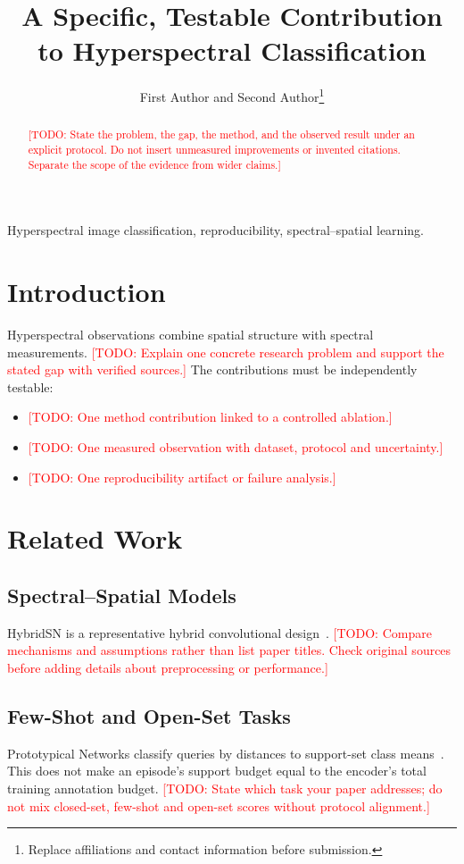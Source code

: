 \documentclass[journal]{IEEEtran}
\newcommand{\placeholder}[1]{\textcolor{red}{[TODO: #1]}}
\begin{document}
\title{A Specific, Testable Contribution to Hyperspectral Classification}
\author{First Author and Second Author\thanks{Replace affiliations and contact information before submission.}}
\maketitle

\begin{abstract}
\placeholder{State the problem, the gap, the method, and the observed result
under an explicit protocol. Do not insert unmeasured improvements or invented
citations. Separate the scope of the evidence from wider claims.}
\end{abstract}
\begin{IEEEkeywords}
Hyperspectral image classification, reproducibility, spectral--spatial learning.
\end{IEEEkeywords}

\section{Introduction}
Hyperspectral observations combine spatial structure with spectral measurements.
\placeholder{Explain one concrete research problem and support the stated gap
with verified sources.}
The contributions must be independently testable:
\begin{itemize}
\item \placeholder{One method contribution linked to a controlled ablation.}
\item \placeholder{One measured observation with dataset, protocol and uncertainty.}
\item \placeholder{One reproducibility artifact or failure analysis.}
\end{itemize}

\section{Related Work}
\subsection{Spectral--Spatial Models}
HybridSN is a representative hybrid convolutional design~\cite{roy2020hybridsn}.
\placeholder{Compare mechanisms and assumptions rather than list paper titles.
Check original sources before adding details about preprocessing or performance.}
\subsection{Few-Shot and Open-Set Tasks}
Prototypical Networks classify queries by distances to support-set class
means~\cite{snell2017prototypical}. This does not make an episode's support
budget equal to the encoder's total training annotation budget.
\placeholder{State which task your paper addresses; do not mix closed-set,
few-shot and open-set scores without protocol alignment.}
\end{document}
